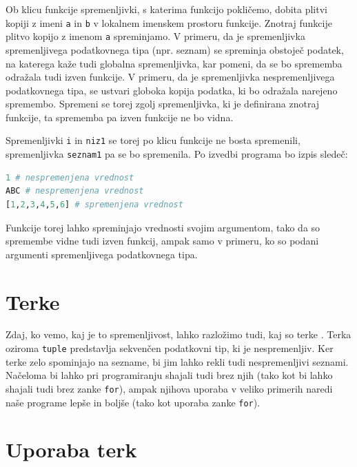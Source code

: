 \begin{resitev}
Ob klicu funkcije spremenljivki, s katerima funkcijo pokličemo, dobita plitvi kopiji z imeni \texttt{a} in \texttt{b} v lokalnem imenskem prostoru funkcije. Znotraj funkcije plitvo kopijo z imenom \texttt{a} spreminjamo. V primeru, da je spremenljivka spremenljivega podatkovnega tipa (npr. seznam) se spreminja obstoječ podatek, na katerega kaže tudi globalna spremenljivka, kar pomeni, da se bo sprememba odražala tudi izven funkcije. V primeru, da je spremenljivka nespremenljivega podatkovnega tipa, se ustvari globoka kopija podatka, ki bo odražala narejeno spremembo. Spremeni se torej zgolj spremenljivka, ki je definirana znotraj funkcije, ta sprememba pa izven funkcije ne bo vidna. 

Spremenljivki \texttt{i} in \texttt{niz1} se torej po klicu funkcije ne bosta spremenili, spremenljivka \texttt{seznam1} pa se bo spremenila. Po izvedbi programa bo izpis sledeč:

\begin{lstlisting}[language=Python, showstringspaces=false]
1 # nespremenjena vrednost
ABC # nespremenjena vrednost
[1,2,3,4,5,6] # spremenjena vrednost
\end{lstlisting}

\end{resitev}

Funkcije torej lahko spreminjajo vrednosti svojim argumentom, tako da so spremembe vidne tudi izven funkcij, ampak samo v primeru, ko so podani argumenti spremenljivega podatkovnega tipa. 



\section{Terke}

Zdaj, ko vemo, kaj je to spremenljivost, lahko razložimo tudi, kaj so terke . Terka oziroma \texttt{tuple} predstavlja sekvenčen podatkovni tip, ki je nespremenljiv. Ker terke zelo spominjajo na sezname, bi jim lahko rekli tudi nespremenljivi seznami. Načeloma bi lahko pri programiranju shajali tudi brez njih (tako kot bi lahko shajali tudi brez zanke \texttt{for}), ampak njihova uporaba v veliko primerih naredi naše programe lepše in boljše (tako kot uporaba zanke \texttt{for}).

\section{Uporaba terk}

